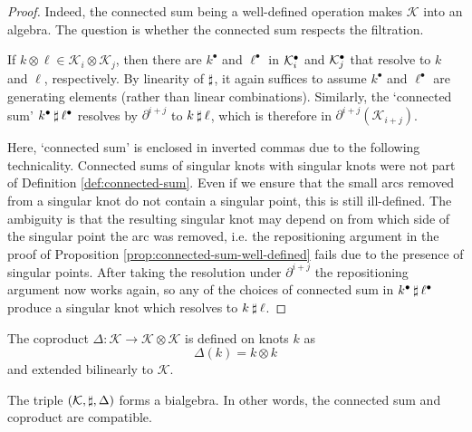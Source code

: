 \begin{proof}
	Indeed, the connected sum being a well-defined operation makes \(\mathcal{K}\) into an algebra. The question is whether the connected sum respects the filtration.

	If \(k \otimes \ell \in \mathcal{K}_{i} \otimes \mathcal{K}_{j}\), then there are \(k^{\bullet}\) and \(\ell^{\bullet}\) in \(\mathcal{K}^{\bullet}_{i}\) and \(\mathcal{K}^{\bullet}_{j}\) that resolve to \(k\) and \(\ell\), respectively. By linearity of \(\mathbin{\sharp}\), it again suffices to assume \(k^{\bullet}\) and \(\ell^{\bullet}\) are generating elements (rather than linear combinations). Similarly, the `connected sum' \(k^{\bullet} \mathbin{\sharp} \ell^{\bullet}\) resolves by \(\partial^{i + j}\) to \(k \mathbin{\sharp} \ell\), which is therefore in \(\partial^{i + j}(\mathcal{K}_{i + j})\).

	Here, `connected sum' is enclosed in inverted commas due to the following technicality. Connected sums of singular knots with singular knots were not part of Definition \ref{def:connected-sum}. Even if we ensure that the small arcs removed from a singular knot do not contain a singular point, this is still ill-defined. The ambiguity is that the resulting singular knot may depend on from which side of the singular point the arc was removed, i.e. the repositioning argument in the proof of Proposition \ref{prop:connected-sum-well-defined} fails due to the presence of singular points. After taking the resolution under \(\partial^{i + j}\) the repositioning argument now works again, so any of the choices of connected sum in \(k^{\bullet} \mathbin{\sharp} \ell^{\bullet}\) produce a singular knot which resolves to \(k \mathbin{\sharp} \ell\).
\end{proof}


\begin{definition}
	The coproduct \(\Delta: \mathcal{K} \to \mathcal{K} \otimes \mathcal{K}\) is defined on knots \(k\) as
	\[\Delta(k) = k \otimes k\]
	and extended bilinearly to \(\mathcal{K}\).
\end{definition}

\begin{proposition}
    The triple \((\mathcal{K}, \mathbin{\sharp}, \Delta)\) forms a bialgebra. In other words, the connected sum and coproduct are compatible.
\end{proposition}


